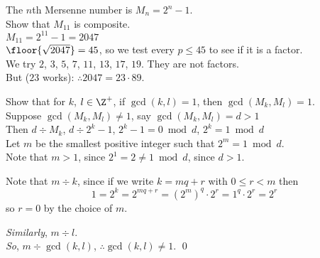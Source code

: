  The $n$th Mersenne number is $M_n=2^n-1$. \\
\eg Show that $M_{11}$ is composite. \\
\soln $M_{11}=2^{11}-1=2047$ \\
$\floor{\sqrt{2047}}=45$, so we test every $p\leq45$ to see if it is a factor. \\
We try $2$, $3$, $5$, $7$, $11$, $13$, $17$, $19$.  They are not factors. \\
But ($23$ works): $\therefore 2047=23\cdot89$.

\eg Show that for $k$, $l\in\Z^+$, if $\gcd(k,l)=1$, then $\gcd(M_k,M_l)=1$. \\
\soln Suppose $\gcd(M_k,M_l)\neq1$, say $\gcd(M_k,M_l)=d>1$ \\
Then $d\div M_k$, $d\div 2^k-1$, $2^k-1=0\bmod d$, $2^k=1\bmod d$ \\
Let $m$ be the smallest positive integer such that $2^m=1\bmod d$. \\
Note that $m>1$, since $2^1=2\neq1\bmod d$, since $d>1$.

Note that $m\div k$, since if we write $k=mq+r$ with $0\leq r<m$ then
\[ 1 = 2^k = 2^{mq+r} = (2^m)^q\cdot2^r = 1^q\cdot2^r = 2^r \]
so $r=0$ by the choice of $m$.

\emph{Similarly}, $m\div l$. \\
\emph{So}, $m\div\gcd(k,l)$, $\therefore\gcd(k,l)\neq1$. \qed

